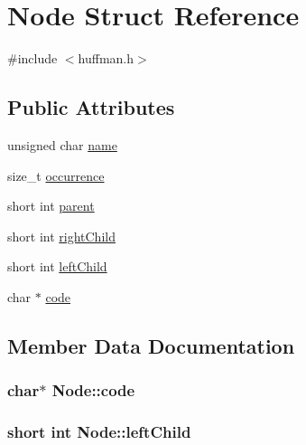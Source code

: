\hypertarget{structNode}{}\section{Node Struct Reference}
\label{structNode}


{\ttfamily \#include $<$huffman.\+h$>$}

\subsection*{Public Attributes}
\begin{DoxyCompactItemize}
\item 
unsigned char \hyperlink{structNode_a04eb56ff6f1e90b23ecf24eb942e917e}{name}
\item 
size\+\_\+t \hyperlink{structNode_ad139abad5af0b935fbb0afbb6a5687d9}{occurrence}
\item 
short int \hyperlink{structNode_aec94630f2572011a0e3640b762f754f6}{parent}
\item 
short int \hyperlink{structNode_a12f0113e6f72ee5d34f4f428c093f63c}{right\+Child}
\item 
short int \hyperlink{structNode_a74565f28d4da7adb3c274d14fa48cee5}{left\+Child}
\item 
char $\ast$ \hyperlink{structNode_ac2557d5574502c1f896e556c5225b5c7}{code}
\end{DoxyCompactItemize}


\subsection{Member Data Documentation}
\subsubsection[{\texorpdfstring{code}{code}}]{\setlength{\rightskip}{0pt plus 5cm}char$\ast$ Node\+::code}\hypertarget{structNode_ac2557d5574502c1f896e556c5225b5c7}{}\label{structNode_ac2557d5574502c1f896e556c5225b5c7}
\subsubsection[{\texorpdfstring{left\+Child}{leftChild}}]{\setlength{\rightskip}{0pt plus 5cm}short int Node\+::left\+Child}\hypertarget{structNode_a74565f28d4da7adb3c274d14fa48cee5}{}\label{structNode_a74565f28d4da7adb3c274d14fa48cee5}
